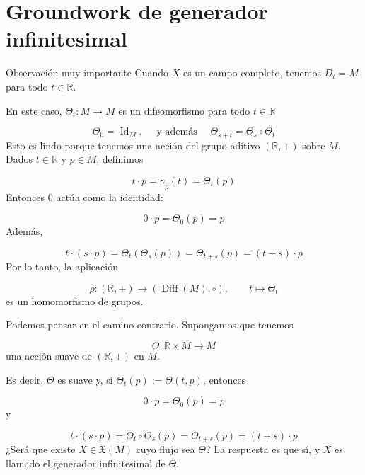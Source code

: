 \section{Groundwork de generador infinitesimal}
\begin{bookremark}{Observación muy importante}
Cuando $X$ es un campo completo, tenemos $D_t=M$ para todo $t\in\mathbb R$.

En este caso, $\Theta_t:M\to M$ es un difeomorfismo para todo $t\in\mathbb R$

\[
\Theta_0=\operatorname{Id}_M, \quad\text{ y además }\quad \Theta_{s+t}=\Theta_s\circ\Theta_t
\]
Esto es lindo porque tenemos una acción del grupo aditivo $(\mathbb R,+)$ sobre $M$. Dados $t\in\mathbb R$ y $p\in M$, definimos

\[
t\cdot p=\gamma_p(t)=\Theta_t(p)
\]
Entonces $0$ actúa como la identidad:

\[
0\cdot p=\Theta_0(p)=p
\]
Además,

\[
t\cdot(s\cdot p)=\Theta_t(\Theta_s(p))=\Theta_{t+s}(p)=(t+s)\cdot p
\]
Por lo tanto, la aplicación

\[
\rho:(\mathbb R,+)\to(\operatorname{Diff}(M),\circ),\qquad t\mapsto\Theta_t
\]
es un homomorfismo de grupos.

\end{bookremark}
\begin{bookremark}{}
Podemos pensar en el camino contrario. Supongamos que tenemos

\[
\Theta:\mathbb R\times M\to M
\]
una acción suave de $(\mathbb R,+)$ en $M$.

Es decir, $\Theta$ es suave y, si $\Theta_t(p):=\Theta(t,p)$, entonces

\[
0\cdot p=\Theta_0(p)=p
\]
y

\[
t\cdot (s\cdot p)=\Theta_t\circ\Theta_s(p)=\Theta_{t+s}(p)=(t+s)\cdot p
\]
¿Será que existe $X\in\mathfrak X(M)$ cuyo flujo sea $\Theta$? La respuesta es que sí, y $X$ es llamado el generador infinitesimal de $\Theta$.

\end{bookremark}
